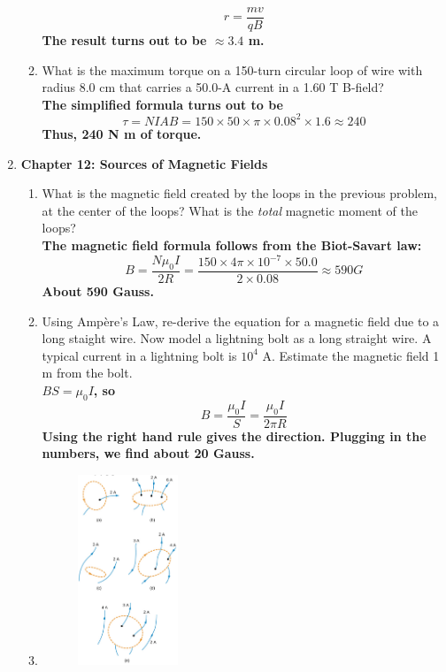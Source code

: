 \documentclass[10pt]{article}
\begin{document}
\begin{enumerate}
\begin{enumerate}
\begin{equation}
r = \frac{mv}{qB}
\end{equation}
\textbf{The result turns out to be $\approx 3.4$ m.}
\item What is the maximum torque on a 150-turn circular loop of wire with radius 8.0 cm that carries a 50.0-A current in a 1.60 T B-field? \\ \textbf{The simplified formula turns out to be}
\begin{equation}
\tau = N I A B = 150 \times 50 \times \pi \times 0.08^2 \times 1.6 \approx 240
\end{equation}
\textbf{Thus, 240 N m of torque.}
\end{enumerate}
\item \textbf{Chapter 12: Sources of Magnetic Fields}
\begin{enumerate}
\item What is the magnetic field created by the loops in the previous problem, at the center of the loops?  What is the \textit{total} magnetic moment of the loops? \\ 
\textbf{The magnetic field formula follows from the Biot-Savart law:}
\begin{equation}
B = \frac{N \mu_0 I}{2R} = \frac{150 \times 4\pi \times 10^{-7} \times 50.0}{2 \times 0.08} \approx 590 G
\end{equation}
\textbf{About 590 Gauss.}
\item Using Amp\`{e}re's Law, re-derive the equation for a magnetic field due to a long staight wire.  Now model a lightning bolt as a long straight wire.  A typical current in a lightning bolt is $10^4$ A. Estimate the magnetic field 1 m from the bolt. \\ \textbf{$BS = \mu_0 I$, so}
\begin{equation}
B = \frac{\mu_0 I}{S} =  \frac{\mu_0 I}{2 \pi R}
\end{equation}
\textbf{Using the right hand rule gives the direction.  Plugging in the numbers, we find about 20 Gauss.}
\item
\begin{figure}
\centering
\includegraphics[width=0.3\textwidth,trim=0cm 0cm 0cm 0.25cm,clip=true]{amplaw.png}

\end{figure}
\end{enumerate}
\end{enumerate}
\end{document}

